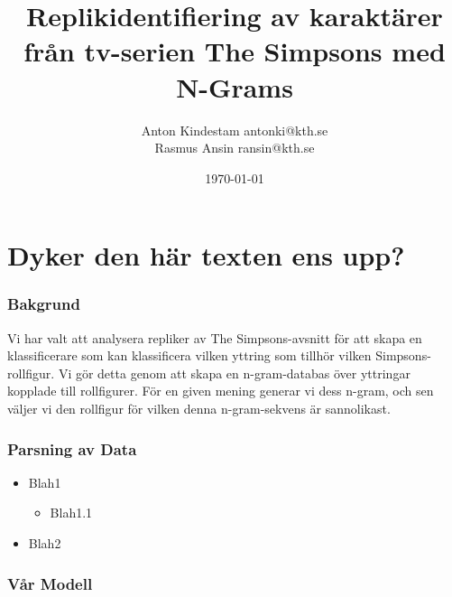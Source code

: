 \documentclass{beamer}
\date{\today}
\title{Replikidentifiering av karaktärer från tv-serien The Simpsons med N-Grams}
\author{Anton Kindestam antonki@kth.se\\Rasmus Ansin ransin@kth.se}
\begin{document}
\frame{\titlepage}






\renewcommand{\thefootnote}{\fnsymbol{footnote}} %



\section{Dyker den här texten ens upp?}



\begin{frame}
 \frametitle{Bakgrund}
  


Vi har valt att analysera repliker av The Simpsons-avsnitt för att
skapa en klassificerare som kan klassificera vilken yttring som
tillhör vilken Simpsons-rollfigur. Vi gör detta genom att skapa en
n-gram-databas över yttringar kopplade till rollfigurer. För en given
mening generar vi dess n-gram, och sen väljer vi den rollfigur för
vilken denna n-gram-sekvens är sannolikast.

  
\end{frame}
\begin{frame}
 \frametitle{Parsning av Data}
  


\begin{itemize}
  \item Blah1
\begin{itemize}
  \item Blah1.1
\end{itemize}
  \item Blah2
\end{itemize}


  
\end{frame}
\begin{frame}
 \frametitle{Vår Modell}
  





  
\end{frame}
\end{document}
